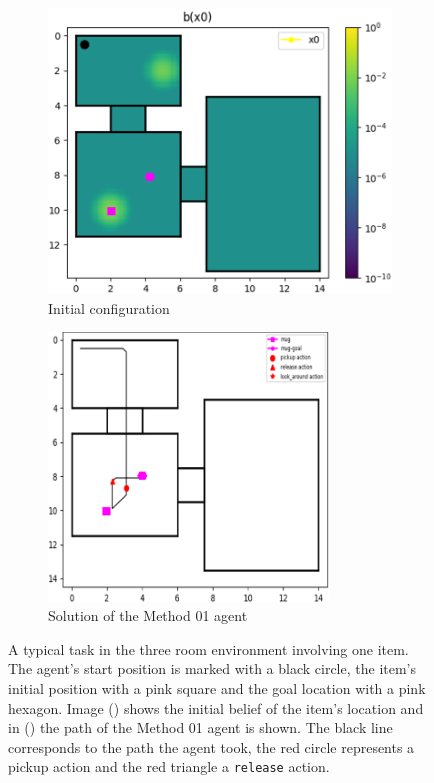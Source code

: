 \begin{figure}
    \centering
    \begin{subfigure}[b]{0.49\textwidth}
        \includegraphics[width=\textwidth]{Report/images/experiments/envsmall_sc01_belief_items.png}
        \caption{Initial configuration}
        \label{subfig:sc01_b0}
    \end{subfigure}
    \hfill
    \begin{subfigure}[b]{0.49\textwidth}
         \includegraphics[width=0.82\textwidth]{Report/images/experiments/envsmall_sc01_sol_D1_edited.png}
        \caption{Solution of the Method 01 agent}
        \label{subfig:sc01_sol}
    \end{subfigure}
    \caption{A typical task in the three room environment involving one item. The agent's start position is marked with a black circle, the item's initial position with a pink square and the goal location with a pink hexagon. Image () shows the initial belief of the item's location and in () the path of the Method 01 agent is shown. The black line corresponds to the path the agent took, the red circle represents a pickup action and the red triangle a \texttt{release} action.}
    \label{fig:sc01}
\end{figure}

